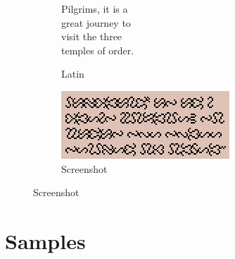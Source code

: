 \documentclass[letterpaper]{article}
\newcommand{\sampletext}[1]{{\samplefont\Large#1}}
\begin{document}
\begin{figure}
\begin{subfigure}{0.32\textwidth}
{    }
  \end{subfigure}
  \begin{subfigure}{0.32\textwidth}
    \centering
    \caption{Latin}
    \sampletext{
      Pilgrims, it is a\\
      great journey to\\
      visit the three\\
      temples of order.
    }
  \end{subfigure}
  \begin{subfigure}{0.32\textwidth}
    \centering
    \caption{Screenshot}

    \includegraphics[scale=0.75]{ophidian-book}
  \end{subfigure}
  
\end{figure}

\section{Samples}
\end{document}

